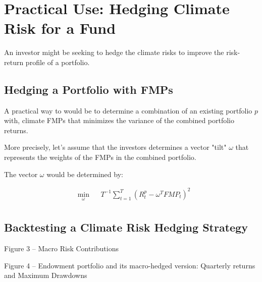 \chapter{Practical Use: Hedging Climate Risk 
for a Fund}

An investor might be seeking to hedge 
the climate risks to improve 
the risk-return profile of a portfolio.

\section{Hedging a Portfolio with FMPs}

A practical way to would be to determine 
a combination of an existing portfolio $p$ with,
climate FMPs that minimizes the variance of 
the combined portfolio returns.

More precisely, let's assume that the 
investors determines a vector "tilt" 
$\omega$ that represents the weights of
the FMPs in the combined portfolio.

The vector $\omega$ would be determined by:

\begin{equation}
    \begin{aligned}
        & \underset{\omega}{\min}
        & &   T^{-1} \sum^T_{t=1} (R^p_t - \omega^T FMP_t)^2\\
    \end{aligned}
\end{equation}


\section{Backtesting a Climate Risk Hedging Strategy}

Figure 3 – Macro Risk Contributions

Figure 4 – Endowment portfolio and its macro-hedged version:
Quarterly returns and Maximum Drawdowns